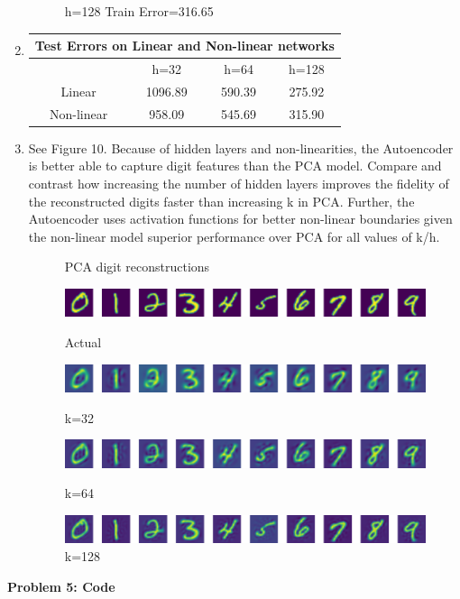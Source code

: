 \begin{enumerate}
\begin{figure}[h!]
	    \caption*{h=128 Train Error=316.65}
	\end{figure}
    \item 
	\hfill
	\begin{tabular}{ |c|c|c|c| }
	    \multicolumn{4}{c}{Test Errors on Linear and Non-linear networks} \\
	    \hline
	    & h=32 & h=64 & h=128 \\
	    \hline
	    Linear & 1096.89 & 590.39 & 275.92 \\
	    \hline
	    Non-linear & 958.09 & 545.69 & 315.90 \\
	    \hline
	\end{tabular}\hfill\mbox{}
    \item  See Figure 10. 
	Because of hidden layers and non-linearities, the Autoencoder is better able to capture digit features than the PCA model. 
	Compare and contrast how increasing the number of hidden layers improves the fidelity of the reconstructed digits faster than increasing k in PCA.
	Further, the Autoencoder uses activation functions for better non-linear boundaries given the non-linear model superior performance over PCA for all values of k/h.
	\begin{figure}[h!]
	    \centering
	    \caption{PCA digit reconstructions} 
	    \includegraphics[width=0.8\linewidth]{../figures/a5_d_actual.pdf}
	    \caption*{Actual}
	    \includegraphics[width=0.8\linewidth]{../figures/a5_d_recon_32.pdf}
	    \caption*{k=32}
	    \includegraphics[width=0.8\linewidth]{../figures/a5_d_recon_64.pdf}
	    \caption*{k=64}
	    \includegraphics[width=0.8\linewidth]{../figures/a5_d_recon_128.pdf}
	    \caption*{k=128}
	\end{figure}

	
\end{enumerate}

{\bf Problem 5: Code}
\begin{quote}
    
\end{quote}
